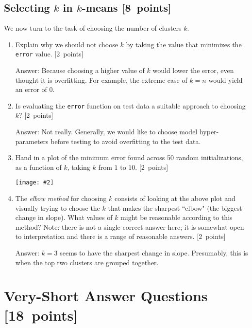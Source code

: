 \documentclass{article}
\newcommand{\blu}[1]{{\textcolor{blu}{#1}}}
\newenvironment{answer}{\par\begingroup\color{gre}Answer: }{\endgroup}
\let\ask\blu
\newcommand\pts[1]{\textcolor{pointscolour}{[#1~points]}}
\newcommand{\centerfig}[2]{\begin{center}\texttt{[image: \#2]}\end{center}}
\begin{document}
    \subsection{Selecting $k$ in $k$-means \pts{8}}

    We now turn to the task of choosing the number of clusters $k$.

    \begin{enumerate}
        \item \ask{Explain why we should not choose $k$ by taking the value that minimizes the \texttt{error} value.} \pts{2}
        \begin{answer}
            Because choosing a higher value of $k$ would lower the error, even thought it is overfitting. For example, the extreme case of $k=n$ would yield an error of $0$.
        \end{answer}

        \item \ask{Is evaluating the \texttt{error} function on test data a suitable approach to choosing $k$?} \pts{2}
        \begin{answer}
            Not really. Generally, we would like to choose model hyper-parameters before testing to avoid overfitting to the test data.
        \end{answer}

        \item \ask{Hand in a plot of the minimum error found across 50 random initializations, as a function of $k$, taking $k$ from $1$ to $10$.} \pts{2}
        \centerfig{0.6}{figs/kmeans_elbow}

        \item The \emph{elbow method} for choosing $k$ consists of looking at the above plot and visually trying to choose the $k$ that makes the sharpest ``elbow" (the biggest change in slope). \ask{What values of $k$ might be reasonable according to this method?} Note: there is not a single correct answer here; it is somewhat open to interpretation and there is a range of reasonable answers. \pts{2}
        \begin{answer}
            $k=3$ seems to have the sharpest change in slope. Presumably, this is when the top two clusters are grouped together.
        \end{answer}
    \end{enumerate}

    \clearpage
    \section{Very-Short Answer Questions \pts{18}}
\end{document}
